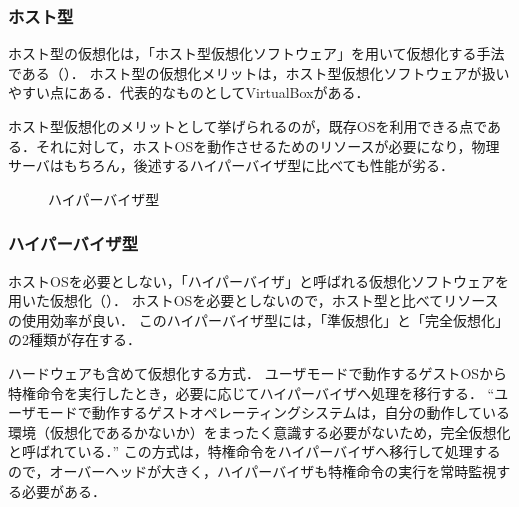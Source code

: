 \subsubsection*{ホスト型}
ホスト型の仮想化は，「ホスト型仮想化ソフトウェア」を用いて仮想化する手法である（）．
ホスト型の仮想化メリットは，ホスト型仮想化ソフトウェアが扱いやすい点にある．代表的なものとしてVirtualBoxがある．\par
ホスト型仮想化のメリットとして挙げられるのが，既存OSを利用できる点である．それに対して，ホストOSを動作させるためのリソースが必要になり，物理サーバはもちろん，後述するハイパーバイザ型に比べても性能が劣る\cite{itmanage}．

\begin{wrapfigure}{r}[0mm]{.3\textwidth}
    \centering
    \caption{ハイパーバイザ型}
    \label{fig:ハイパーバイザ型}
    \vspace{-1cm}
\end{wrapfigure}

\subsubsection*{ハイパーバイザ型}
ホストOSを必要としない，「ハイパーバイザ」と呼ばれる仮想化ソフトウェアを用いた仮想化（）．
ホストOSを必要としないので，ホスト型と比べてリソースの使用効率が良い．
このハイパーバイザ型には，「準仮想化」と「完全仮想化」の2種類が存在する．
\begin{description}
    \setlength{\leftskip}{1em}
    \item[完全仮想化] ハードウェアも含めて仮想化する方式．
        ユーザモードで動作するゲストOSから{{特権命令を実行した}}とき，必要に応じてハイパーバイザへ処理を移行する．
        ``ユーザモードで動作するゲストオペレーティングシステムは，自分の動作している環境（仮想化であるかないか）をまったく意識する必要がないため，完全仮想化と呼ばれている．''\cite[p.159]{オペレーティングシステム}
        この方式は，特権命令をハイパーバイザへ移行して処理するので，オーバーヘッドが大きく，ハイパーバイザも特権命令の実行を常時監視する必要がある．
\end{description}

